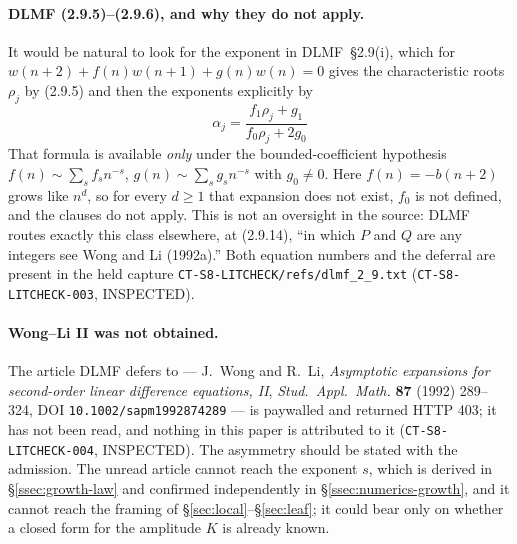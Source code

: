 \paragraph{DLMF (2.9.5)--(2.9.6), and why they do not apply.} It would be
natural to look for the exponent in DLMF~\S2.9(i), which for
$w(n+2)+f(n)w(n+1)+g(n)w(n)=0$ gives the characteristic roots $\rho_j$ by
(2.9.5) and then the exponents explicitly by
\[
  \alpha_j=\frac{f_1\rho_j+g_1}{f_0\rho_j+2g_0}
  \tag{DLMF 2.9.6}
\]
That formula is available \emph{only} under the bounded-coefficient hypothesis
$f(n)\sim\sum_s f_s n^{-s}$, $g(n)\sim\sum_s g_s n^{-s}$ with $g_0\neq0$. Here
$f(n)=-b(n+2)$ grows like $n^{d}$, so for every $d\ge1$ that expansion does not
exist, $f_0$ is not defined, and the clauses do not apply. This is not an
oversight in the source: DLMF routes exactly this class elsewhere, at (2.9.14),
``in which $P$ and $Q$ are any integers see Wong and Li (1992a).'' Both equation
numbers and the deferral are present in the held capture
\texttt{CT-S8-LITCHECK/refs/dlmf\_2\_9.txt}
(\texttt{CT-S8-LITCHECK-003}, INSPECTED).

\paragraph{Wong--Li II was not obtained.} The article DLMF defers to ---
J.~Wong and R.~Li, \emph{Asymptotic expansions for second-order linear
difference equations, II}, \emph{Stud.\ Appl.\ Math.} \textbf{87} (1992)
289--324, DOI \texttt{10.1002/sapm1992874289} --- is paywalled and returned HTTP
403; it has not been read, and nothing in this paper is attributed to it
(\texttt{CT-S8-LITCHECK-004}, INSPECTED). The asymmetry should be stated with
the admission. The unread article cannot reach the exponent $s$, which is
derived in \S\ref{ssec:growth-law} and confirmed independently in
\S\ref{ssec:numerics-growth}, and it cannot reach the framing of
\S\ref{sec:local}--\S\ref{sec:leaf}; it could bear only on whether a closed form
for the amplitude $K$ is already known.

